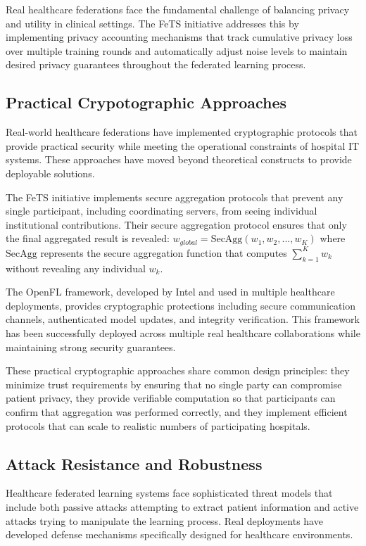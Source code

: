 \documentclass[3p,times,procedia]{elsarticle}
\begin{document}
Real healthcare federations face the fundamental challenge of balancing privacy and utility in clinical settings. The FeTS initiative addresses this by implementing privacy accounting mechanisms that track cumulative privacy loss over multiple training rounds and automatically adjust noise levels to maintain desired privacy guarantees throughout the federated learning process.

\subsection{Practical Crypotographic Approaches}

Real-world healthcare federations have implemented cryptographic protocols that provide practical security while meeting the operational constraints of hospital IT systems. These approaches have moved beyond theoretical constructs to provide deployable solutions.

The FeTS initiative implements secure aggregation protocols that prevent any single participant, including coordinating servers, from seeing individual institutional contributions. Their secure aggregation protocol ensures that only the final aggregated result is revealed:
$w_{global} = \text{SecAgg}(w_1, w_2, ..., w_K)$
where $\text{SecAgg}$ represents the secure aggregation function that computes $\sum_{k=1}^{K} w_k$ without revealing any individual $w_k$.

The OpenFL framework, developed by Intel and used in multiple healthcare deployments, provides cryptographic protections including secure communication channels, authenticated model updates, and integrity verification. This framework has been successfully deployed across multiple real healthcare collaborations while maintaining strong security guarantees.

These practical cryptographic approaches share common design principles: they minimize trust requirements by ensuring that no single party can compromise patient privacy, they provide verifiable computation so that participants can confirm that aggregation was performed correctly, and they implement efficient protocols that can scale to realistic numbers of participating hospitals.

\subsection{Attack Resistance and Robustness}

Healthcare federated learning systems face sophisticated threat models that include both passive attacks attempting to extract patient information and active attacks trying to manipulate the learning process. Real deployments have developed defense mechanisms specifically designed for healthcare environments.
\end{document}
